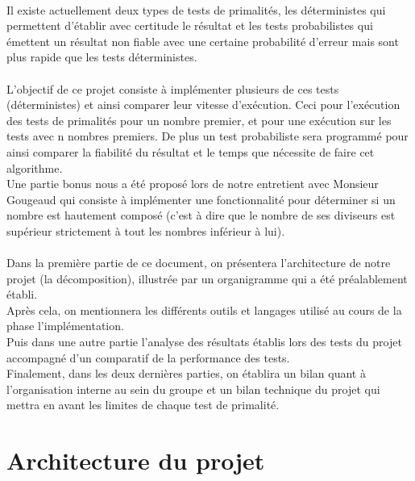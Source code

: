 	\paragraph{}Il existe actuellement deux types de tests de primalités, les déterministes qui permettent d'établir avec certitude le résultat et les tests probabilistes qui émettent un résultat non fiable avec une certaine probabilité d'erreur mais sont plus rapide que les tests déterministes.
	
	\paragraph{}L'objectif de ce projet consiste à implémenter plusieurs de ces tests (déterministes) et ainsi comparer leur vitesse  d'exécution. Ceci pour l'exécution des tests de primalités pour un nombre premier, et pour une exécution sur les tests avec n nombres premiers. De plus un test probabiliste sera programmé pour ainsi comparer la fiabilité du résultat et le temps que nécessite de faire cet algorithme.\\ 
	Une partie bonus nous a été proposé lors de notre entretient avec Monsieur Gougeaud qui consiste à implémenter une fonctionnalité pour déterminer si un nombre est hautement composé (c'est à dire que le nombre de ses diviseurs est supérieur strictement à tout les nombres inférieur à lui). 
	
	\paragraph{}Dans la première partie de ce document, on présentera l'architecture de notre projet (la décomposition), illustrée par un organigramme qui a été préalablement établi.\\
	Après cela, on mentionnera les différents outils et langages utilisé au cours de la phase l'implémentation.\\
	Puis dans une autre partie l'analyse des résultats établis lors des tests du projet accompagné d'un comparatif de la performance des tests.\\
	Finalement, dans les deux dernières parties, on établira un bilan quant à l'organisation interne au sein du groupe et un bilan technique du projet qui mettra en avant les limites de chaque test de primalité.
	
		
	\section{Architecture du projet}
